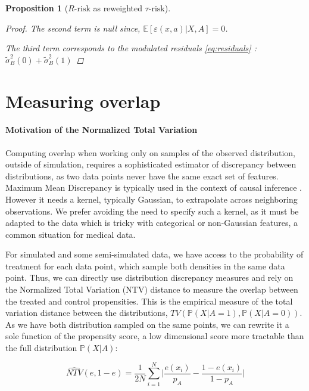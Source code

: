 \documentclass{report}
\newtheorem{proposition*}{Proposition}
\newtheorem{proof}{Proof}
\begin{document}
\begin{appendices}
\begin{proposition*}[$R\text{-risk}$ as reweighted $\tau
        \text{-risk}$]
\begin{proof}
      The second term is null since, $\mathbb E[\varepsilon(x, a) |X, A]=0$.

      The third term corresponds to the modulated residuals \ref{eq:residuals} :
      $\tilde{\sigma}_B^2(0) + \tilde{\sigma}_B^2(1)$

    \end{proof}
  \end{proposition*}

  \section{Measuring overlap}\label{apd:motivation_ntv}

  \paragraph{Motivation of the Normalized Total Variation}
  Computing overlap when working only on samples of the observed distribution,
  outside of simulation, requires a sophisticated estimator of discrepancy
  between distributions, as two data points never have the same exact set of
  features. Maximum Mean Discrepancy \citep{gretton2012kernel} is typically
  used in the context of causal inference
  \citep{shalit_estimating_2017,johansson2022generalization}. However it
  needs a kernel, typically Gaussian, to extrapolate across neighboring
  observations. We prefer avoiding the need to specify such a kernel, as it must
  be adapted to the data which is tricky with categorical or non-Gaussian
  features, a common situation for medical data.

  For simulated and some semi-simulated data, we have access to the probability of
  treatment for each data point, which sample both densities in the same data
  point. Thus, we can directly use distribution discrepancy measures and rely on
  the Normalized Total Variation (NTV) distance to measure the overlap between the
  treated and control propensities. This is the empirical measure of the total
  variation distance \citep{sriperumbudur_integral_2009} between the distributions,
  $TV(\mathbb{P}(X|A=1), \mathbb{P}(X|A=0))$. As we have both distribution sampled
  on the same points, we can rewrite it a sole function of the propensity score, a
  low dimensional score more tractable than the full distribution $\mathbb
    P(X|A)$:

  \begin{equation}\label{eq:ntv}
    \widehat{NTV}(e, 1-e) = \frac{1}{2N} \sum_{i =1}^{N} \big |\frac{e(x_i)}{p_A}-\frac{1-e(x_i)}{1-{p_A}} \big |
  \end{equation}


\end{appendices}
\end{document}
